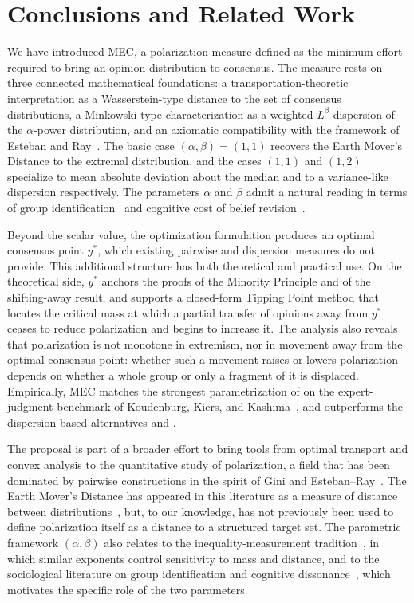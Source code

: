 \section{Conclusions and Related Work}\label{sec:conclusion}

We have introduced MEC, a polarization measure defined as the minimum
effort required to bring an opinion distribution to consensus. The
measure rests on three connected mathematical foundations: a
transportation-theoretic interpretation as a Wasserstein-type distance
to the set of consensus distributions, a Minkowski-type characterization
as a weighted $L^\beta$-dispersion of the $\alpha$-power distribution,
and an axiomatic compatibility with the framework of Esteban and
Ray~\cite{esteban1994measurement}. The basic case $(\alpha,\beta)=(1,1)$
recovers the Earth Mover's Distance to the extremal distribution, and
the cases $(1,1)$ and $(1,2)$ specialize to mean absolute deviation
about the median and to a variance-like dispersion respectively. The
parameters $\alpha$ and $\beta$ admit a natural reading in terms of
group identification~\cite{TajfelTurner1979} and cognitive cost of
belief revision~\cite{Festinger1957}.

Beyond the scalar value, the optimization formulation produces an
optimal consensus point $y^*$, which existing pairwise and dispersion
measures do not provide. This additional structure has both
theoretical and practical use. On the theoretical side, $y^*$ anchors
the proofs of the Minority Principle and of the shifting-away
result, and supports a closed-form Tipping Point method that locates
the critical mass at which a partial transfer of opinions away from
$y^*$ ceases to reduce polarization and begins to increase it. The
analysis also reveals that polarization is not monotone in extremism,
nor in movement away from the optimal consensus point: whether such a
movement raises or lowers polarization depends on whether a whole group
or only a fragment of it is displaced. Empirically, MEC matches the
strongest parametrization of \ERLabel{} on the expert-judgment
benchmark of Koudenburg, Kiers, and Kashima~\cite{koudenburg2021new}, and
outperforms the dispersion-based alternatives \VdELabel{} and
\TWDLabel.

The proposal is part of a broader effort to bring tools from optimal
transport and convex analysis to the quantitative study of polarization,
a field that has been dominated by pairwise constructions in the spirit
of Gini and Esteban--Ray~\cite{esteban1994measurement,foster85}. The
Earth Mover's Distance has appeared in this literature as a measure of
distance between distributions~\cite{geher2020isometric,vallender1974calculation},
but, to our knowledge, has not previously been used to define
polarization itself as a distance to a structured target set. The
parametric framework $(\alpha,\beta)$ also relates to the
inequality-measurement tradition~\cite{foster85}, in which similar
exponents control sensitivity to mass and distance, and to the
sociological literature on group identification and cognitive
dissonance~\cite{TajfelTurner1979,Festinger1957}, which motivates the
specific role of the two parameters.

